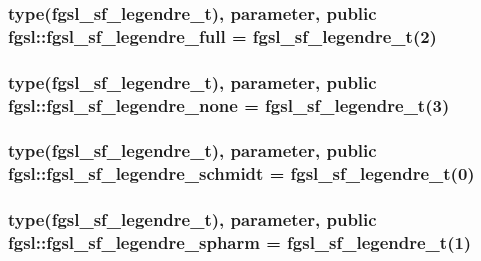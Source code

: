 \subsubsection[{fgsl\+\_\+sf\+\_\+legendre\+\_\+full}]{\setlength{\rightskip}{0pt plus 5cm}type({\bf fgsl\+\_\+sf\+\_\+legendre\+\_\+t}), parameter, public fgsl\+::fgsl\+\_\+sf\+\_\+legendre\+\_\+full = {\bf fgsl\+\_\+sf\+\_\+legendre\+\_\+t}(2)}\label{namespacefgsl_a8a929fa82ff6c96e5022ee2346fb2732}
\hypertarget{namespacefgsl_ab780f015ad3062497e33c2629f13e021}{}
\subsubsection[{fgsl\+\_\+sf\+\_\+legendre\+\_\+none}]{\setlength{\rightskip}{0pt plus 5cm}type({\bf fgsl\+\_\+sf\+\_\+legendre\+\_\+t}), parameter, public fgsl\+::fgsl\+\_\+sf\+\_\+legendre\+\_\+none = {\bf fgsl\+\_\+sf\+\_\+legendre\+\_\+t}(3)}\label{namespacefgsl_ab780f015ad3062497e33c2629f13e021}
\hypertarget{namespacefgsl_a8b170e3b737833743129ce02b48f23a9}{}
\subsubsection[{fgsl\+\_\+sf\+\_\+legendre\+\_\+schmidt}]{\setlength{\rightskip}{0pt plus 5cm}type({\bf fgsl\+\_\+sf\+\_\+legendre\+\_\+t}), parameter, public fgsl\+::fgsl\+\_\+sf\+\_\+legendre\+\_\+schmidt = {\bf fgsl\+\_\+sf\+\_\+legendre\+\_\+t}(0)}\label{namespacefgsl_a8b170e3b737833743129ce02b48f23a9}
\hypertarget{namespacefgsl_a13c5fa76fa6a114bff70b0d830517e5c}{}
\subsubsection[{fgsl\+\_\+sf\+\_\+legendre\+\_\+spharm}]{\setlength{\rightskip}{0pt plus 5cm}type({\bf fgsl\+\_\+sf\+\_\+legendre\+\_\+t}), parameter, public fgsl\+::fgsl\+\_\+sf\+\_\+legendre\+\_\+spharm = {\bf fgsl\+\_\+sf\+\_\+legendre\+\_\+t}(1)}\label{namespacefgsl_a13c5fa76fa6a114bff70b0d830517e5c}
\hypertarget{namespacefgsl_a82c8fc2281b4c13609c41ae8b7f1cb1e}{}
